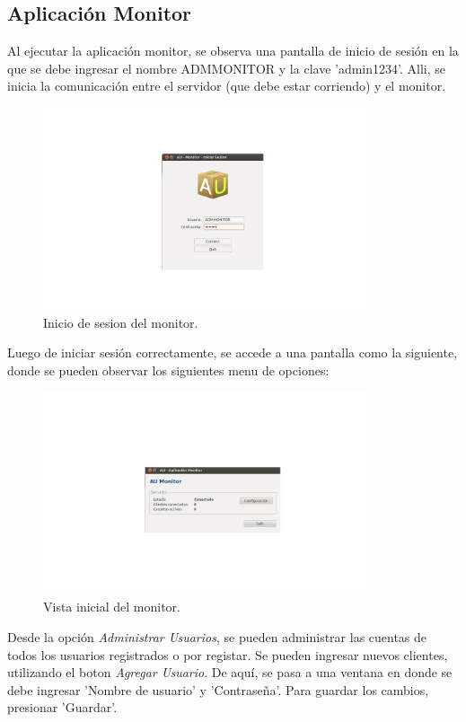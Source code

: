 \documentclass{article}
\begin{document}
\subsection{Aplicación Monitor}
\smallskip
	Al ejecutar la aplicación monitor, se observa una pantalla de inicio de sesión en la que se debe ingresar el nombre ADMMONITOR y la clave 'admin1234'. Alli, se inicia la comunicación entre el servidor (que debe estar corriendo) y el monitor.
	\begin{figure}[h]
       \centering
       \includegraphics[width=0.85\textwidth]{InicioMonitor.png}
	\bigskip
       \caption{Inicio de sesion del monitor.}
	\end{figure}
	Luego de iniciar sesión correctamente, se accede a una pantalla como la siguiente, donde se pueden observar los siguientes menu de opciones: 
	\begin{figure}[h]
       \centering
       \includegraphics[width=0.85\textwidth]{MonitorPPal.png}
	\bigskip
       \caption{Vista inicial del monitor.}
	\end{figure}
	Desde la opción \textit{Administrar Usuarios}, se pueden administrar las cuentas de todos los usuarios registrados o por registar. Se pueden ingresar nuevos clientes, utilizando el boton \textit{Agregar Usuario}. De aquí, se pasa a una ventana en donde se debe ingresar 'Nombre de usuario' y 'Contraseña'. Para guardar los cambios, presionar 'Guardar'.
\end{document}
